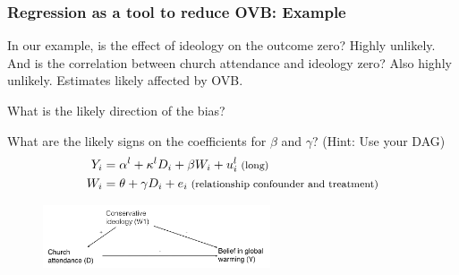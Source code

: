 \documentclass[12pt,english,dvipsnames,aspectratio=169,handout]{beamer}\usepackage[]{graphicx}\usepackage[]{xcolor}
\begin{document}
\begin{frame}
\frametitle{Regression as a tool to reduce OVB: Example}

\footnotesize
In our example, is the effect of ideology on the outcome zero? Highly unlikely. And is the correlation between church attendance and ideology zero? Also highly unlikely. Estimates likely affected by OVB.

What is the likely direction of the bias?

What are the likely signs on the coefficients for $\beta$ and $\gamma$? (Hint: Use your DAG)
\vspace{-5mm}
\begin{align*} \footnotesize
    Y_i &= \alpha^l + \kappa^l D_i + \beta W_i + u_i^l\;\text{\footnotesize  (long)} \\
    W_i &= \theta + \gamma D_i + e_i\;\text{\footnotesize (relationship confounder and treatment)}
\end{align*}
 
\pause
    \begin{figure}
    \includegraphics[width=0.6\textwidth]{../04-figures/03/04-w3_dag2b}
    \end{figure}

\end{frame}
\end{document}
